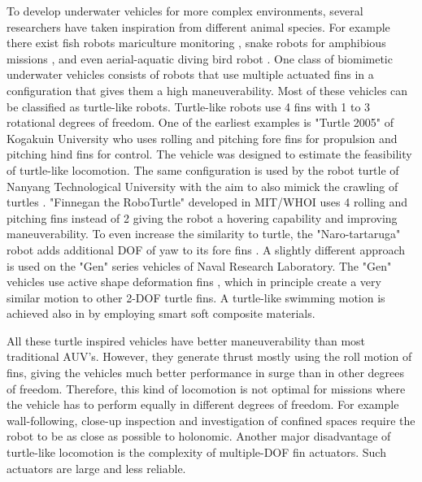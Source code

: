 \documentclass[conference]{IEEEtran}
\begin{document}
To develop underwater vehicles for more complex environments, several researchers have taken inspiration from different animal species. For example there exist fish robots mariculture monitoring \cite{ryuh2015school}, snake robots for amphibious missions \cite{kohl2016snake}, and even aerial-aquatic diving bird robot \cite{lock2010bird}. One class of biomimetic underwater vehicles consists of robots that use multiple actuated fins in a configuration that gives them a high maneuverability. Most of these vehicles can be classified as turtle-like robots. Turtle-like robots use 4 fins with 1 to 3 rotational degrees of freedom. One of the earliest examples is "Turtle 2005" \cite{konno2005submergence} of Kogakuin University who uses rolling and pitching fore fins for propulsion and pitching hind fins for control. The vehicle was designed to estimate the feasibility of turtle-like locomotion. The same configuration is used by the robot turtle of Nanyang Technological University with the aim to also mimick the crawling of turtles \cite{low2007turtle}. "Finnegan the RoboTurtle" \cite{licht2008finnegan} developed in MIT/WHOI uses 4 rolling and pitching fins instead of 2 giving the robot a hovering capability and improving maneuverability. To even increase the similarity to turtle, the "Naro-tartaruga" robot \cite{siegenthaler2013naro} adds additional DOF of yaw to its fore fins \cite{font2011naro}. A slightly different approach is used on the "Gen" series vehicles \cite{geder2013maneuvering} of Naval Research Laboratory. The "Gen" vehicles use active shape deformation fins \cite{geder2014fin}, which in principle create a very similar motion to other 2-DOF turtle fins. A turtle-like swimming motion is achieved also in \cite{kim2013turtle} by employing smart soft composite materials.

All these turtle inspired vehicles have better maneuverability than most traditional AUV's. However, they generate thrust mostly using the roll motion of fins, giving the vehicles much better performance in surge than in other degrees of freedom. Therefore, this kind of locomotion is not optimal for missions where the vehicle has to perform equally in different degrees of freedom. For example wall-following, close-up inspection and investigation of confined spaces require the robot to be as close as possible to holonomic. Another major disadvantage of turtle-like locomotion is the complexity of multiple-DOF fin actuators. Such actuators are large and less reliable.
\end{document}

